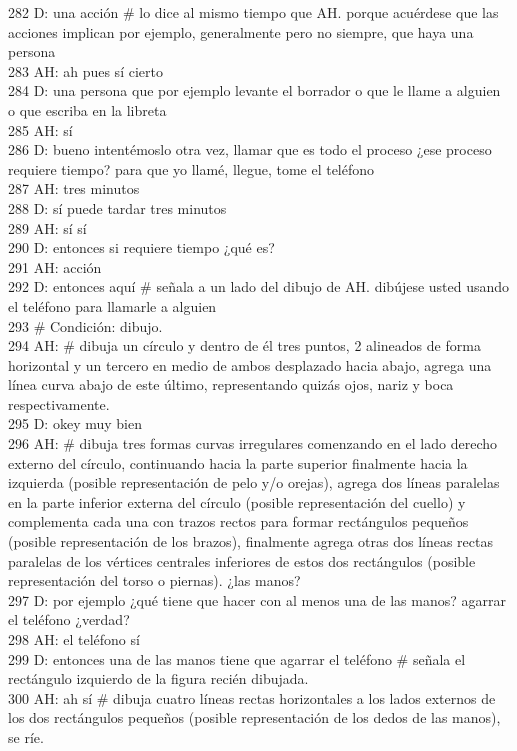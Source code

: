 282 D: una acción \# lo dice al mismo tiempo que AH. porque acuérdese que las acciones implican por ejemplo, generalmente pero no siempre, que haya una persona\\
283 AH: ah pues sí cierto\\
284 D: una persona que por ejemplo levante el borrador o que le llame a alguien o que escriba en la libreta\\
285 AH: sí\\
286 D: bueno intentémoslo otra vez, llamar que es todo el proceso ¿ese proceso requiere tiempo? para que yo llamé, llegue, tome el teléfono\\
287 AH: tres minutos\\
288 D: sí puede tardar tres minutos\\
289 AH: sí sí\\
290 D: entonces si requiere tiempo ¿qué es?\\
291 AH: acción\\
292 D: entonces aquí \# señala a un lado del dibujo de AH. dibújese usted usando el teléfono para llamarle a alguien\\
293 \# Condición: dibujo.\\
294 AH: \# dibuja un círculo y dentro de él tres puntos, 2 alineados de forma horizontal y un tercero en medio de ambos desplazado hacia abajo, agrega una línea curva abajo de este último, representando quizás ojos, nariz y boca respectivamente.\\
295 D: okey muy bien\\
296 AH: \# dibuja tres formas curvas irregulares comenzando en el lado derecho externo del círculo, continuando hacia la parte superior  finalmente hacia la izquierda (posible representación de pelo y/o orejas), agrega dos líneas paralelas en la parte inferior externa del círculo (posible representación del cuello) y complementa cada una con trazos rectos para formar rectángulos pequeños (posible representación de los brazos), finalmente agrega otras dos líneas rectas paralelas de los vértices centrales inferiores de estos dos rectángulos (posible representación del torso o piernas). ¿las manos?\\
297 D: por ejemplo ¿qué tiene que hacer con al menos una de las manos? agarrar el teléfono ¿verdad?\\
298 AH: el teléfono sí\\
299 D: entonces una de las manos tiene que agarrar el teléfono \# señala el rectángulo izquierdo de la figura recién dibujada.\\
300 AH: ah sí \# dibuja cuatro líneas rectas horizontales a los lados externos de los dos rectángulos pequeños (posible representación de los dedos de las manos), se ríe.\\
